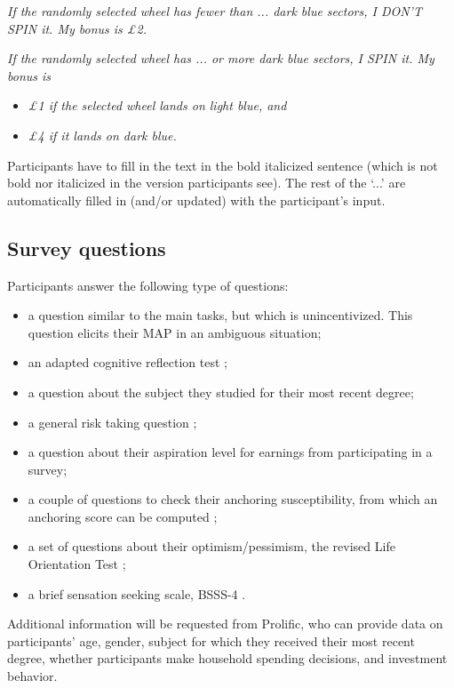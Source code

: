 \textit{If the randomly selected wheel has fewer than ... dark blue sectors, I DON'T SPIN it.
My bonus is \pounds2.}

\textit{If the randomly selected wheel has ... or more dark blue sectors, I SPIN it.
My bonus is}
\begin{itemize}
\item \textit{\pounds1 if the selected wheel lands on light blue, and}
\item \textit{\pounds4 if it lands on dark blue.}
\end{itemize}

Participants have to fill in the text in the bold italicized sentence (which is not bold nor italicized in the version participants see).
The rest of the `...' are automatically filled in (and/or updated) with the participant's input.

\subsection{Survey questions}
Participants answer the following type of questions:
\begin{itemize}
\item a question similar to the main tasks, but which is unincentivized. This question elicits their MAP in an ambiguous situation;
\item an adapted cognitive reflection test \citep{Frederick2005,Thomson2016};
\item a question about the subject they studied for their most recent degree;
\item a general risk taking question \citep{Dohmen2011};
\item a question about their aspiration level for earnings from participating in a survey;
\item a couple of questions to check their anchoring susceptibility, from which an anchoring score can be computed \citep{Cheek2017};
\item a set of questions about their optimism/pessimism, the revised Life Orientation Test \citep{Scheier1994};
\item a brief sensation seeking scale, BSSS-4 \citep{Stephenson2003}.
\end{itemize}

Additional information will be requested from Prolific, who can provide data on participants' age, gender, subject for which they received their most recent degree, whether participants make household spending decisions, and investment behavior.




